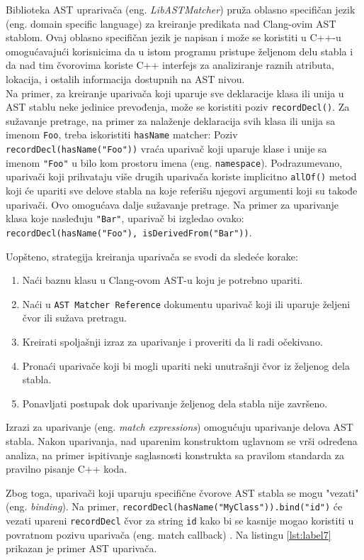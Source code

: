 \documentclass[12pt,oneside]{memoir}
\begin{document}
Biblioteka AST uprariva\v{c}a (eng. \textit{LibASTMatcher}) pruža oblasno specifičan jezik (eng. domain specific language) za kreiranje predikata nad Clang-ovim AST stablom. Ovaj oblasno specifičan jezik je napisan i može se koristiti u C++-u omogućavajući korisnicima da u istom programu pristupe željenom delu stabla i da nad tim čvorovima koriste C++ interfejs za analiziranje raznih atributa, lokacija, i ostalih informacija dostupnih na AST nivou.
\\ Na primer, za kreiranje upariva\v{c}a koji uparuje sve deklaracije klasa ili unija u AST stablu neke jedinice prevođenja, može se koristiti poziv \lstinline{recordDecl()}. Za sužavanje pretrage, na primer za nalaženje deklaracija svih klasa ili unija sa imenom \lstinline{Foo}, treba iskoristiti \lstinline{hasName} matcher: Poziv \lstinline{recordDecl(hasName("Foo"))} vraća upariva\v{c} koji uparuje klase i unije sa imenom \lstinline{"Foo"} u bilo kom prostoru imena (eng. \lstinline{namespace}). Podrazumevano, upariva\v{c}i koji prihvataju više drugih upariva\v{c}a koriste implicitno \lstinline{allOf()} metod koji \'{c}e upariti sve delove stabla na koje referi\v{s}u njegovi argumenti koji su takođe upariva\v{c}i. Ovo omogućava dalje sužavanje pretrage. Na primer za uparivanje klasa koje nasleđuju \lstinline{"Bar"}, upariva\v{c} bi izgledao ovako: \lstinline{recordDecl(hasName("Foo"), isDerivedFrom("Bar"))}.
\par

Uopšteno, strategija kreiranja upariva\v{c}a se svodi da sledeće korake:
\begin{enumerate}
\item Na\'{c}i baznu klasu u Clang-ovom AST-u koju je potrebno upariti.
 
\item Na\'{c}i u \texttt{AST Matcher Reference} dokumentu upariva\v{c} koji ili uparuje \v{z}eljeni čvor ili su\v{z}ava pretragu.
\item Kreirati spoljašnji izraz za uparivanje i proveriti da li radi o\v{c}ekivano.
\item Prona\'{c}i upariva\v{c}e koji bi mogli upariti neki unutrašnji čvor iz željenog dela stabla.
\item Ponavljati postupak dok uparivanje željenog dela stabla nije završeno.
\end{enumerate}

Izrazi za uparivanje (eng. \textit{match expressions}) omogu\'{c}uju uparivanje delova AST stabla. Nakon uparivanja, nad uparenim konstruktom uglavnom se vr\v{s}i određena analiza, na primer ispitivanje saglasnosti konstrukta sa pravilom standarda za pravilno pisanje C++ koda.
\par
Zbog toga, upariva\v{c}i koji uparuju specifi\v{c}ne čvorove AST stabla se mogu "vezati" (eng. \textit{binding}). Na primer, \lstinline{recordDecl(hasName("MyClass")).bind("id")} će vezati upareni \lstinline{recordDecl} čvor za string \lstinline{id} kako bi se kasnije mogao koristiti u povratnom pozivu upariva\v{c}a (eng. match callback) \cite{matchers}. Na listingu \ref{lst:label7} prikazan je primer AST upariva\v{c}a.
\end{document}
